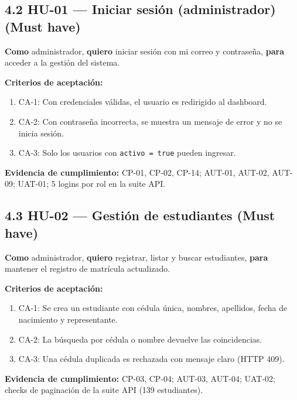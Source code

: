 \documentclass[11pt,a4paper]{article}
\begin{document}
\subsection*{4.2 HU-01 --- Iniciar sesión (administrador) \textbf{(Must have)}}


\textbf{Como} administrador, \textbf{quiero} iniciar sesión con mi correo y contraseña, \textbf{para} acceder a la gestión del sistema.


\textbf{Criterios de aceptación:}


\begin{enumerate}[leftmargin=*]
\item CA-1: Con credenciales válidas, el usuario es redirigido al dashboard.
\item CA-2: Con contraseña incorrecta, se muestra un mensaje de error y no se inicia sesión.
\item CA-3: Solo los usuarios con \texttt{activo = true} pueden ingresar.
\end{enumerate}


\textbf{Evidencia de cumplimiento:} CP-01, CP-02, CP-14; AUT-01, AUT-02, AUT-09; UAT-01; 5 logins por rol en la suite API.


\subsection*{4.3 HU-02 --- Gestión de estudiantes \textbf{(Must have)}}


\textbf{Como} administrador, \textbf{quiero} registrar, listar y buscar estudiantes, \textbf{para} mantener el registro de matrícula actualizado.


\textbf{Criterios de aceptación:}


\begin{enumerate}[leftmargin=*]
\item CA-1: Se crea un estudiante con cédula única, nombres, apellidos, fecha de nacimiento y representante.
\item CA-2: La búsqueda por cédula o nombre devuelve las coincidencias.
\item CA-3: Una cédula duplicada es rechazada con mensaje claro (HTTP 409).
\end{enumerate}


\textbf{Evidencia de cumplimiento:} CP-03, CP-04; AUT-03, AUT-04; UAT-02; checks de paginación de la suite API (139 estudiantes).
\end{document}
